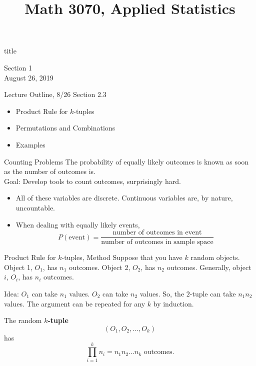 \documentclass[]{beamer}
\title{Math 3070, Applied Statistics}
\newcommand{\nl}[1]{\vspace{#1 em}}
\begin{document}
\begin{frame}
    \begin{beamercolorbox}[rounded=true,wd=\textwidth,center]{title}
        \inserttitle
    \end{beamercolorbox}
    \begin{center}
        Section 1\\
        \nl{0.5}
        August 26, 2019
    \end{center}

\end{frame}

\begin{frame}{Lecture Outline, 8/26}
    Section 2.3
    \begin{itemize}
        \item Product Rule for $k$-tuples
        \item Permutations and Combinations
        \item Examples
    \end{itemize}
\end{frame}

\begin{frame}{Counting Problems}
    The probability of equally likely outcomes is known as soon as the number of outcomes is.\\
    \nl{0.5}
    Goal: Develop tools to count outcomes, surprisingly hard.\\
    \nl{0.5}
    \begin{itemize}
    \item All of these variables are discrete. Continuous variables are, by nature, uncountable.
    \item When dealing with equally likely events,
    \pause \[P(\text{event}) = \frac{\text{number of outcomes in event}}{\text{number of outcomes in sample space}}\]
    \end{itemize}
\end{frame}

\begin{frame}{Product Rule for $k$-tuples, Method}
    Suppose that you have $k$ random objects. Object 1, $O_1$, has $n_1$ outcomes. Object 2, $O_2$, has $n_2$ outcomes. Generally, object $i$, $O_i$, has $n_i$ outcomes. 
    
    \pause Idea: $O_1$ can take $n_1$ values.  $O_2$ can take $n_2$ values. So, the $2$-tuple can take $n_1 n_2$ values. The argument can be repeated for any $k$ by induction.

    \pause The random {\bf $k$-tuple}
    \[(O_1, O_2, \ldots, O_k)\]
    has 
    \[\prod_{i=1}^k n_i = n_1 n_2 \ldots n_k \text{ outcomes.}\]    
\end{frame}
\end{document}

